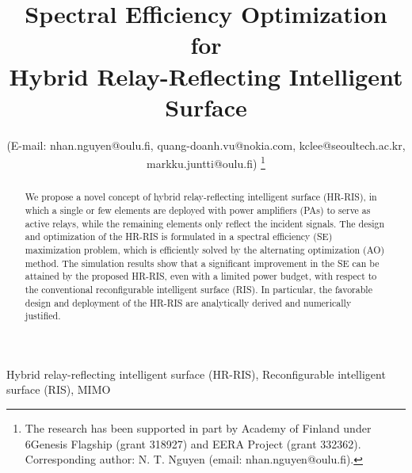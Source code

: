 \documentclass[conference]{IEEEtran}
\begin{document}
	
	\title{Spectral Efficiency Optimization for \\Hybrid Relay-Reflecting Intelligent Surface}
	
	\author{
		(E-mail: nhan.nguyen@oulu.fi, quang-doanh.vu@nokia.com, kclee@seoultech.ac.kr, markku.juntti@oulu.fi)%
		\thanks{The research has been supported in part by Academy of Finland under 6Genesis Flagship (grant 318927) and EERA Project (grant 332362). 
			Corresponding author: N. T. Nguyen (email: nhan.nguyen@oulu.fi).}}
	
	
	\maketitle
	
	
	\begin{abstract}
		We propose a novel concept of hybrid relay-reflecting intelligent surface (HR-RIS), in which a single or few elements are deployed with power amplifiers (PAs) to serve as active relays, while the remaining elements only reflect the incident signals. The design and optimization of the HR-RIS is formulated in a spectral efficiency (SE) maximization problem, which is efficiently solved by the alternating optimization (AO) method. The simulation results show that a significant improvement in the SE can be attained by the proposed HR-RIS, even with a limited power budget, with respect to the conventional reconfigurable intelligent surface (RIS). In particular, the favorable design and deployment of the HR-RIS are analytically derived and numerically justified.
	\end{abstract}
	
	\begin{IEEEkeywords}
    Hybrid relay-reflecting intelligent surface (HR-RIS), Reconfigurable intelligent surface (RIS), MIMO
    \end{IEEEkeywords}
	
\end{document}
